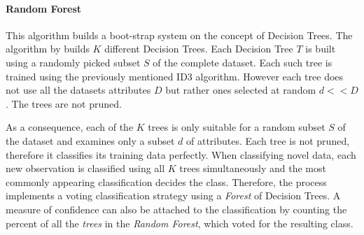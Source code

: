	\paragraph{Random Forest}
		This algorithm builds a boot-strap system on the concept of Decision Trees. The algorithm by \cite{breiman1984classification} builds $ K $ different Decision Trees. Each Decision Tree $ T $ is built using a randomly picked subset $ S $ of the complete dataset. Each such tree is trained using the previously mentioned ID3 algorithm. However each tree does not use all the datasets attributes $ D $ but rather ones selected at random $ d << D $. The trees are not pruned. 
		
		\par
		As a consequence, each of the $ K $ trees is only suitable for a random subset $ S $ of the dataset and examines only a subset $ d $ of attributes. Each tree is not pruned, therefore it classifies its training data perfectly. When classifying novel data, each new observation is classified using all $ K $ trees simultaneously and the most commonly appearing classification decides the class. Therefore, the process implements a voting classification strategy using a \textit{Forest} of Decision Trees. A measure of confidence can also be attached to the classification by counting the percent of all the \textit{trees} in the \textit{Random Forest}, which voted for the resulting class.
 
	
	
